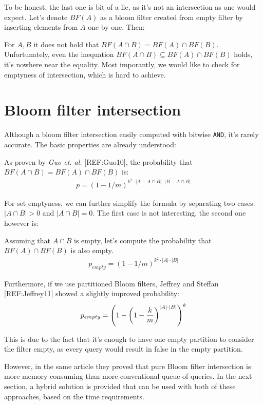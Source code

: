 To be honest, the last one is bit of a lie, as it's not an intersection as one
would expect. Let's denote $BF(A)$ as a bloom filter created from empty filter
by inserting elements from $A$ one by one. Then:

For $A,B$ it does not hold that $BF(A \cap B) = BF(A) \cap
BF(B)$. Unfortunately, even the inequation $BF(A \cap B) \subseteq BF(A) \cap
BF(B)$ holds, it's nowhere near the equality. Most imporantly, we would like to
check for emptyness of intersection, which is hard to achieve.

\section{Bloom filter intersection}

Although a bloom filter intersection easily computed with bitwise {\tt AND},
it's rarely accurate. The basic properties are already understood:

As proven by {\it Guo et. al.} [REF:Guo10], the probability that $BF(A\cap B) =
BF(A) \cap BF(B)$ is:
\begin{align}
p = (1-1/m)^{k^2\cdot |A-A\cap B| \cdot |B - A\cap B|}
\end{align}

For set emptyness, we can further simplify the formula by separating two cases:
$|A \cap B| > 0$ and $|A \cap B| = 0$. The first case is not interesting, the
second one however is:

Assuming that $A\cap B$ is empty, let's compute the probability that $BF(A) \cap
BF(B)$ is also empty.
\begin{align}
	p_{empty} = (1-1/m)^{k^2 \cdot |A| \cdot |B|}
\end{align}

Furthermore, if we use partitioned Bloom filters, Jeffrey and Steffan
[REF:Jeffrey11] showed a slightly improved probability:
\begin{align}
	p_{empty} = \left(1 - \left( 1 - {k \over m}\right)^{|A|\cdot |B|}\right)^k
\end{align}

This is due to the fact that it's enough to have one empty partition to consider
the filter empty, as every query would result in false in the empty partition.

However, in the same article they proved that pure Bloom filter intersection is more
memory-consuming than more conventional queue-of-queries. In the next section,
a hybrid solution is provided that can be used with both of these approaches,
based on the time requirements.

